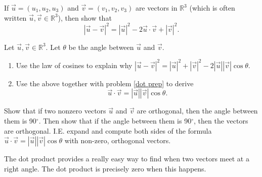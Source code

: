 
\begin{problem}\label{prob:dot prep} 
If $\vec u = (u_1,u_2,u_3)$ and $\vec v= (v_1,v_2,v_3)$ are vectors in $\mathbb{R}^3$ (which is often written $\vec u,\vec v\in\mathbb{R}^3$), then show that 
$$|\vec u-\vec v|^2 = |\vec u|^2-2\vec u\cdot \vec v +|\vec v|^2.$$
\end{problem}

\begin{problem}\label{prob:dot angle formula}  
%
Let $\vec u,\vec v\in\mathbb{R}^3$. Let $\theta$ be the angle between $\vec u$ and $\vec v$. 
\begin{enumerate}
\item Use the law of cosines to explain why $|\vec u-\vec v|^2=|\vec u|^2+|\vec v|^2-2|\vec u||\vec v|\cos\theta$.
\item Use the above together with problem \ref{dot prep} to derive $$\vec u\cdot \vec v=|\vec u||\vec v|\cos\theta.$$
\end{enumerate}
\end{problem}

\begin{problem} 
%
Show that if two nonzero vectors $\vec u$ and $\vec v$ are orthogonal, then the angle between them is 90$^\circ$. Then show that if the angle between them is 90$^\circ$, then the vectors are orthogonal. I.E. expand and compute both sides of the formula $\vec u\cdot \vec v=|\vec u||\vec v|\cos\theta$ with non-zero, orthogonal vectors.
\end{problem}

The dot product provides a really easy way to find when two vectors meet at a right angle. The dot product is precisely zero when this happens.




